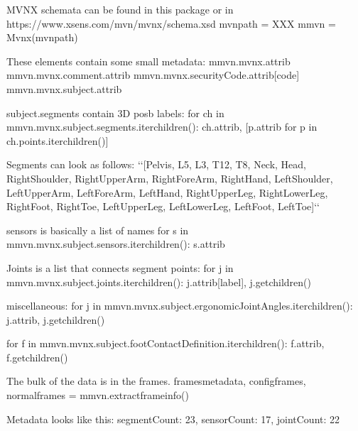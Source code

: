 \documentclass[letterpaper,10pt,english,openany,oneside]{sphinxmanual}
\begin{document}
\begin{sphinxVerbatim}[commandchars=\\\{\}]
\PYGZsh{} MVNX schemata can be found in this package or in
\PYGZsh{} https://www.xsens.com/mvn/mvnx/schema.xsd
mvn\PYGZus{}path = \PYGZdq{}XXX\PYGZdq{}
mmvn = Mvnx(mvn\PYGZus{}path)

\PYGZsh{} These elements contain some small metadata:
mmvn.mvnx.attrib
mmvn.mvnx.comment.attrib
mmvn.mvnx.securityCode.attrib[\PYGZdq{}code\PYGZdq{}]
mmvn.mvnx.subject.attrib

\PYGZsh{} subject.segments contain 3D pos\PYGZus{}b labels:
for ch in mmvn.mvnx.subject.segments.iterchildren():
    ch.attrib, [p.attrib for p in ch.points.iterchildren()]

\PYGZsh{} Segments can look as follows: {}`{}`[\PYGZsq{}Pelvis\PYGZsq{}, \PYGZsq{}L5\PYGZsq{}, \PYGZsq{}L3\PYGZsq{}, \PYGZsq{}T12\PYGZsq{}, \PYGZsq{}T8\PYGZsq{}, \PYGZsq{}Neck\PYGZsq{},
\PYGZsq{}Head\PYGZsq{}, \PYGZsq{}RightShoulder\PYGZsq{}, \PYGZsq{}RightUpperArm\PYGZsq{}, \PYGZsq{}RightForeArm\PYGZsq{}, \PYGZsq{}RightHand\PYGZsq{},
\PYGZsq{}LeftShoulder\PYGZsq{}, \PYGZsq{}LeftUpperArm\PYGZsq{}, \PYGZsq{}LeftForeArm\PYGZsq{}, \PYGZsq{}LeftHand\PYGZsq{}, \PYGZsq{}RightUpperLeg\PYGZsq{},
\PYGZsq{}RightLowerLeg\PYGZsq{}, \PYGZsq{}RightFoot\PYGZsq{}, \PYGZsq{}RightToe\PYGZsq{}, \PYGZsq{}LeftUpperLeg\PYGZsq{}, \PYGZsq{}LeftLowerLeg\PYGZsq{},
\PYGZsq{}LeftFoot\PYGZsq{}, \PYGZsq{}LeftToe\PYGZsq{}]{}`{}`

\PYGZsh{} sensors is basically a list of names
for s in mmvn.mvnx.subject.sensors.iterchildren():
    s.attrib

\PYGZsh{}  Joints is a list that connects segment points:
for j in mmvn.mvnx.subject.joints.iterchildren():
    j.attrib[\PYGZdq{}label\PYGZdq{}], j.getchildren()

\PYGZsh{} miscellaneous:
for j in mmvn.mvnx.subject.ergonomicJointAngles.iterchildren():
    j.attrib, j.getchildren()

for f in mmvn.mvnx.subject.footContactDefinition.iterchildren():
    f.attrib, f.getchildren()

\PYGZsh{} The bulk of the data is in the frames.
frames\PYGZus{}metadata, config\PYGZus{}frames, normal\PYGZus{}frames = mmvn.extract\PYGZus{}frame\PYGZus{}info()

\PYGZsh{} Metadata looks like this:
\PYGZob{}\PYGZsq{}segmentCount\PYGZsq{}: \PYGZsq{}23\PYGZsq{}, \PYGZsq{}sensorCount\PYGZsq{}: \PYGZsq{}17\PYGZsq{}, \PYGZsq{}jointCount\PYGZsq{}: \PYGZsq{}22\PYGZsq{}\PYGZcb{}


\end{sphinxVerbatim}
\end{document}
